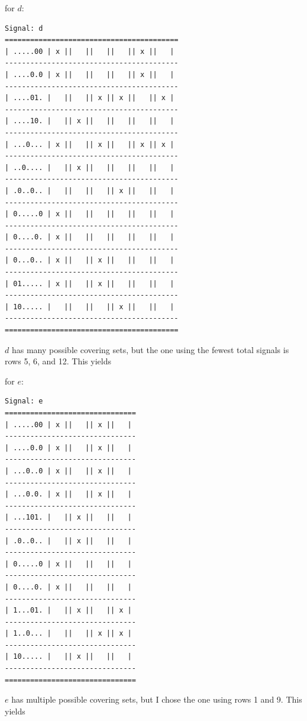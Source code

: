\documentclass{article}
\begin{document}
\begin{enumerate}
            for $d$:
            \begin{scriptsize}
            \begin{verbatim}
Signal: d
=========================================
| .....00 | x ||   ||   ||   || x ||   |
-----------------------------------------
| ....0.0 | x ||   ||   ||   || x ||   |
-----------------------------------------
| ....01. |   ||   || x || x ||   || x |
-----------------------------------------
| ....10. |   || x ||   ||   ||   ||   |
-----------------------------------------
| ...0... | x ||   || x ||   || x || x |
-----------------------------------------
| ..0.... |   || x ||   ||   ||   ||   |
-----------------------------------------
| .0..0.. |   ||   ||   || x ||   ||   |
-----------------------------------------
| 0.....0 | x ||   ||   ||   ||   ||   |
-----------------------------------------
| 0....0. | x ||   ||   ||   ||   ||   |
-----------------------------------------
| 0...0.. | x ||   || x ||   ||   ||   |
-----------------------------------------
| 01..... | x ||   || x ||   ||   ||   |
-----------------------------------------
| 10..... |   ||   ||   || x ||   ||   |
-----------------------------------------
=========================================
            \end{verbatim}
            \end{scriptsize}
            $d$ has many possible covering sets, but the one using the fewest
            total signals is rows 5, 6, and 12. This yields

            for $e$:
            \begin{scriptsize}
            \begin{verbatim}
Signal: e
===============================
| .....00 | x ||   || x ||   |
-------------------------------
| ....0.0 | x ||   || x ||   |
-------------------------------
| ...0..0 | x ||   || x ||   |
-------------------------------
| ...0.0. | x ||   || x ||   |
-------------------------------
| ...101. |   || x ||   ||   |
-------------------------------
| .0..0.. |   || x ||   ||   |
-------------------------------
| 0.....0 | x ||   ||   ||   |
-------------------------------
| 0....0. | x ||   ||   ||   |
-------------------------------
| 1...01. |   || x ||   || x |
-------------------------------
| 1..0... |   ||   || x || x |
-------------------------------
| 10..... |   || x ||   ||   |
-------------------------------
===============================
            \end{verbatim}
            \end{scriptsize}
            $e$ has multiple possible covering sets, but I chose the one using
            rows 1 and 9. This yields 
            \pagebreak


\end{enumerate}
\end{document}
